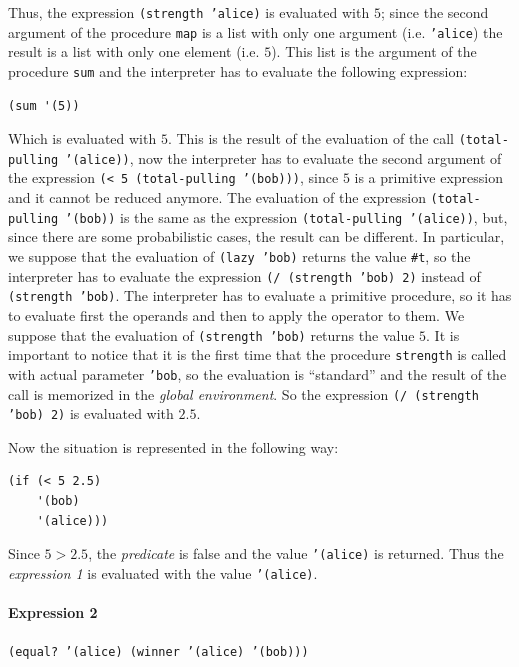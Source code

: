 \begin{itemize}
        Thus, the expression \texttt{(strength 'alice)} is evaluated with $5$; since the second argument of the procedure \texttt{map}
        is a list with only one argument (i.e. \texttt{'alice}) the result is a list with only one element (i.e. $5$).
        This list is the argument of the procedure \texttt{sum} and the interpreter has to evaluate the following expression:
        \begin{lstlisting}[caption={Expression to be evaluated after evaluating the expression in Listing~\ref{lst:map}}, captionpos=b]
(sum '(5))
        \end{lstlisting}
        Which is evaluated with $5$. This is the result of the evaluation of the call \texttt{(total-pulling '(alice))}, now the
        interpreter has to evaluate the second argument of the expression \texttt{(< 5 (total-pulling '(bob)))}, since $5$ is 
        a primitive expression and it cannot be reduced anymore.
        The evaluation of the expression \texttt{(total-pulling '(bob))} is the same as the expression 
        \texttt{(total-pulling '(alice))}, but, since there are some probabilistic cases, the result can be different. In particular,
        we suppose that the evaluation of \texttt{(lazy 'bob)} returns the value \texttt{\#t}, so the interpreter has to evaluate the
        expression \texttt{(/ (strength 'bob) 2)} instead of \texttt{(strength 'bob)}. The interpreter has to evaluate a primitive
        procedure, so it has to evaluate first the operands and then to apply the operator to them.
        We suppose that the evaluation of \texttt{(strength 'bob)} returns the value $5$. It is important to notice that it is the
        first time that the procedure \texttt{strength} is called with actual parameter \texttt{'bob}, so the evaluation is
        ``standard'' and the result of the call is memorized in the \textit{global environment}. 
        So the expression \texttt{(/ (strength 'bob) 2)} is evaluated with $2.5$.

        Now the situation is represented in the following way:
        \begin{lstlisting}[caption={Expression to be evaluated after evaluating \texttt{(total-pulling 'bob)}}, captionpos=b]
(if (< 5 2.5)
    '(bob)
    '(alice)))  
        \end{lstlisting}
        Since $5 > 2.5$, the \textit{predicate} is false and the value \texttt{'(alice)} is returned. Thus the \textit{expression 1}
        is evaluated with the value \texttt{'(alice)}.


        \paragraph*{Expression 2} \texttt{(equal? '(alice) (winner '(alice) '(bob)))}


\end{itemize}
